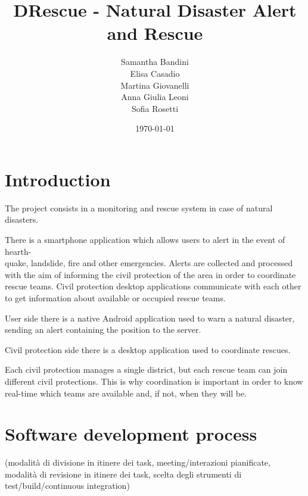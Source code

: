 \documentclass[a4paper,12pt]{report}
\title{DRescue - Natural Disaster Alert and Rescue}
\author{Samantha Bandini\\Elisa Casadio\\Martina Giovanelli\\Anna Giulia Leoni\\Sofia Rosetti}
\date{\today}
\begin{document}
\maketitle

\tableofcontents

\chapter{Introduction}

The project consists in a monitoring and rescue system in case of natural disasters. 

There is a smartphone application which allows users to alert in the event of hearth-\\quake, landslide, fire and other emergencies.
Alerts are collected and processed with the aim of informing the civil protection of the area in order to coordinate rescue teams.
Civil protection desktop applications communicate with each other to get information about available or occupied rescue teams.

User side there is a native Android application used to warn a natural disaster, sending an alert containing the position to the server.

Civil protection side there is a desktop application used to coordinate rescues.

Each civil protection manages a single district, but each rescue team can join different civil protections. This is why coordination is important in order to know real-time which teams are available and, if not, when they will be.


\chapter{Software development process}

(modalità di divisione in itinere dei task, meeting/interazioni pianificate, modalità di revisione in itinere dei task, scelta degli strumenti di test/build/continuous integration)\\
\end{document}
